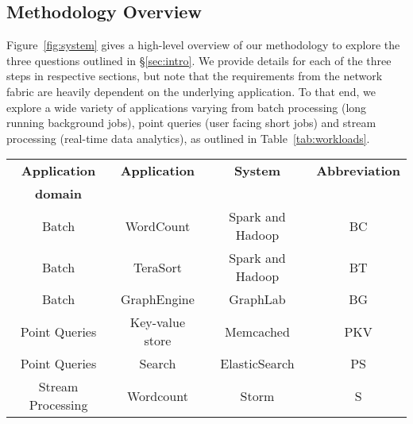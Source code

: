 \subsection{Methodology Overview}
Figure~\ref{fig:system} gives a high-level overview of our methodology to explore the three questions outlined in \S\ref{sec:intro}. We provide details for each of the three steps in respective sections, but note that the requirements from the network fabric are heavily dependent on the underlying application. To that end, we explore a wide variety of applications varying from batch processing (long running background jobs), point queries (user facing short jobs) and stream processing (real-time data analytics), as outlined in Table~\ref{tab:workloads}. 

\begin{table*}
	\centering
	\caption{\small{Workloads and applications used in our evaluation. }}
	\label{tab:workloads}
	\vspace{0.1in}
  \begin{tabular}{c|c|c|c}
	  \hline
		\textbf{Application} & \textbf{Application} & \textbf{System} & \textbf{Abbreviation}\\
		\textbf{domain} & \textbf{} & \textbf{} & \textbf{}\\\hline \hline
    Batch & WordCount & Spark and Hadoop & BC\\\hline
    Batch & TeraSort & Spark and Hadoop & BT\\\hline
    Batch & GraphEngine & GraphLab & BG\\\hline
    Point Queries & Key-value store & Memcached & PKV\\\hline
    Point Queries & Search & ElasticSearch & PS\\\hline
    Stream Processing & Wordcount & Storm & S\\\hline
    \hline
\end{tabular}
\end{table*}

